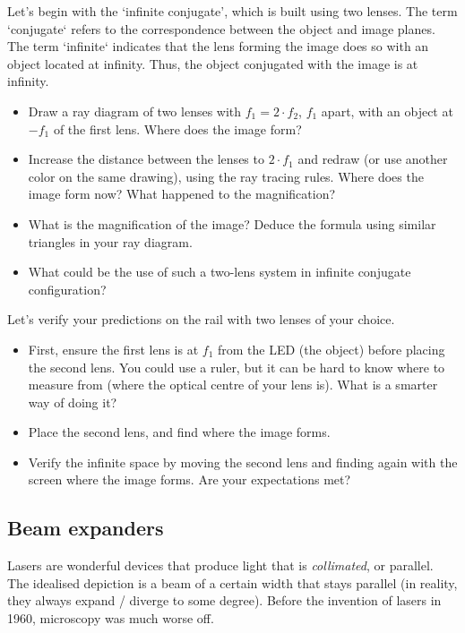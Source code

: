 \documentclass[a4paper]{report}
\begin{document}
	Let's begin with the `infinite conjugate', which is built using two lenses. 
	The term `conjugate` refers to the correspondence between the object and image planes. 
	The term `infinite` indicates that the lens forming the image does so with an object located at infinity.
	Thus, the object conjugated with the image is at infinity. 

	\begin{itemize}
		\item Draw a ray diagram of two lenses with $f_1=2 \cdot f_2$, $f_1$ apart, with an object at $-f_1$ of the first lens. Where does the image form? 
		\item Increase the distance between the lenses to $2\cdot f_1$ and redraw (or use another color on the same drawing), using the ray tracing rules. Where does the image form now? What happened to the magnification?
		\item What is the magnification of the image? Deduce the formula using similar triangles in your ray diagram.
		\item What could be the use of such a two-lens system in infinite conjugate configuration?
	\end{itemize}

    \noindent
	Let's verify your predictions on the rail with two lenses of your choice.  
	
	\begin{itemize}    
	    \item First, ensure the first lens is at $f_1$ from the LED (the object) before placing the second lens. You could use a ruler, but it can be hard to know where to measure from (where the optical centre of your lens is). What is a smarter way of doing it?
	    \item Place the second lens, and find where the image forms.
	    \item Verify the infinite space by moving the second lens and finding again with the screen where the image forms. Are your expectations met?
	\end{itemize}


	
	
	\subsection{Beam expanders}
	\hypertarget{hintBack-expand}{}
	
	Lasers are wonderful devices that produce light that is \emph{collimated}, or parallel. The idealised depiction is a beam of a certain width that stays parallel (in reality, they always expand / diverge to some degree). Before the invention of lasers in 1960, microscopy was much worse off.
	
\end{document}
